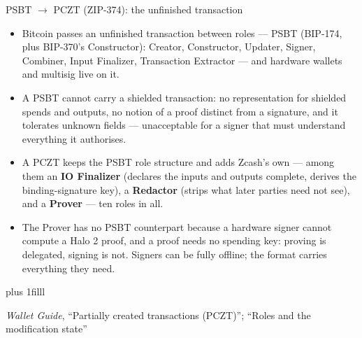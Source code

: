 \documentclass[aspectratio=169,11pt]{beamer}
\newcommand{\src}[1]{\par\vskip0pt plus 1filll
  {\fontsize{6}{7.2}\selectfont\color{arbdim}\raggedright #1\par}}
\begin{document}
\begin{frame}{PSBT $\to$ PCZT (ZIP-374): the unfinished transaction}
\small
\begin{itemize}
  \item Bitcoin passes an unfinished transaction between roles --- PSBT
    (BIP-174, plus BIP-370's Constructor): Creator, Constructor, Updater,
    Signer, Combiner, Input Finalizer, Transaction Extractor --- and
    hardware wallets and multisig live on it.
  \item A PSBT cannot carry a shielded transaction: no representation
    for shielded spends and outputs, no notion of a proof distinct from
    a signature, and it tolerates unknown fields --- unacceptable for a
    signer that must understand everything it authorises.
  \item A PCZT keeps the PSBT role structure and adds Zcash's own ---
    among them an \textbf{IO Finalizer} (declares the inputs and outputs
    complete, derives the binding-signature key), a \textbf{Redactor}
    (strips what later parties need not see), and a \textbf{Prover} ---
    ten roles in all.
  \item The Prover has no PSBT counterpart because a hardware signer
    cannot compute a Halo 2 proof, and a proof needs no spending key:
    proving is delegated, signing is not. Signers can be fully offline;
    the format carries everything they need.
\end{itemize}
\src{\emph{Wallet Guide}, ``Partially created transactions (PCZT)'';
  ``Roles and the modification state''}
\end{frame}
\end{document}
